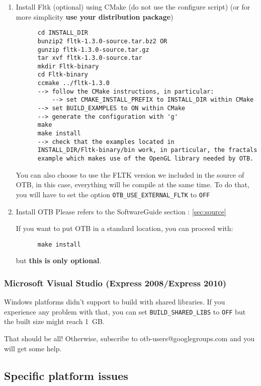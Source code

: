 \begin{enumerate}
\item Install Fltk (optional) using CMake (do not use the configure script) (or for more simplicity \textbf{use your distribution package})
  \begin{verbatim}
      cd INSTALL_DIR
      bunzip2 fltk-1.3.0-source.tar.bz2 OR
      gunzip fltk-1.3.0-source.tar.gz
      tar xvf fltk-1.3.0-source.tar
      mkdir Fltk-binary
      cd Fltk-binary
      ccmake ../fltk-1.3.0
      --> follow the CMake instructions, in particular:
          --> set CMAKE_INSTALL_PREFIX to INSTALL_DIR within CMake
	  --> set BUILD_EXAMPLES to ON within CMake
	  --> generate the configuration with 'g'
      make
      make install
      --> check that the examples located in
      INSTALL_DIR/Fltk-binary/bin work, in particular, the fractals
      example which makes use of the OpenGL library needed by OTB.
  \end{verbatim}

   You can also choose to use the FLTK version we included in the source of OTB, in this case, everything will be compile at the same time. To do that, you will have to set the option \texttt{OTB\_USE\_EXTERNAL\_FLTK} to \texttt{OFF}

\item Install OTB
  Please refers to the SoftwareGuide section : \ref{sec:source}

  If you want to put OTB in a standard location, you can proceed with:

  \begin{verbatim}
      make install
  \end{verbatim}

  but \textbf{this is only optional}.


\end{enumerate}

\subsubsection{Microsoft Visual Studio (Express 2008/Express 2010)}
Windows platforms didn't support to build with shared libraries. If you experience any problem
with that, you can set \texttt{BUILD\_SHARED\_LIBS} to \texttt{OFF} but the
built size might reach 1~GB. 

That should be all! Otherwise, subscribe to
   otb-users@googlegroups.com and you will get some help.

\subsection{Specific platform issues}
